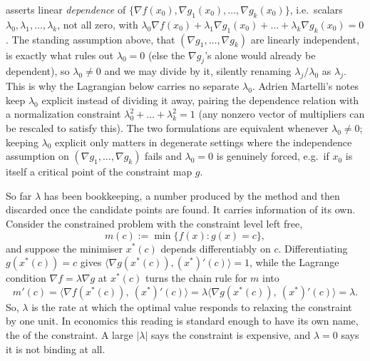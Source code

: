 \begin{remark}
 asserts linear \emph{dependence} of
$\{\nabla f(x_0), \nabla g_1(x_0), \dots, \nabla g_k(x_0)\}$, i.e.\ scalars
$\lambda_0, \lambda_1, \dots, \lambda_k$, not all zero, with
$\lambda_0 \nabla f(x_0) + \lambda_1 \nabla g_1(x_0) + \dots + \lambda_k \nabla g_k(x_0) = 0$.
The standing assumption above, that $(\nabla g_1,\dots,\nabla g_k)$ are linearly independent, is
exactly what rules out $\lambda_0 = 0$ (else the $\nabla g_j$'s alone would already be dependent),
so $\lambda_0 \neq 0$ and we may divide by it, silently renaming $\lambda_j/\lambda_0$ as
$\lambda_j$. This is why the Lagrangian below carries no separate $\lambda_0$. Adrien Martelli's
notes keep $\lambda_0$ explicit instead of dividing it away, pairing the dependence relation with
a normalization constraint $\lambda_0^2 + \dots + \lambda_k^2 = 1$ (any nonzero vector of
multipliers can be rescaled to satisfy this). The two formulations are equivalent whenever
$\lambda_0 \neq 0$; keeping $\lambda_0$ explicit only matters in degenerate settings where the
independence assumption on $(\nabla g_1,\dots,\nabla g_k)$ fails and $\lambda_0 = 0$ is genuinely
forced, e.g.\ if $x_0$ is itself a critical point of the constraint map $g$.
\end{remark}

\begin{remark}
\label{rem:lagrange_multiplier_sensitivity}
So far $\lambda$ has been bookkeeping, a number produced by the method and then discarded once
the candidate points are found. It carries information of its own. Consider the constrained
problem with the constraint level left free,
\[m(c) := \min\{f(x) : g(x) = c\},\]
and suppose the minimiser $x^*(c)$ depends differentiably on $c$. Differentiating
$g(x^*(c)) = c$ gives $\langle \nabla g(x^*(c)), (x^*)'(c)\rangle = 1$, while the Lagrange
condition $\nabla f = \lambda\nabla g$ at $x^*(c)$ turns the chain rule for $m$ into
\[m'(c) = \big\langle \nabla f(x^*(c)),\ (x^*)'(c)\big\rangle
        = \lambda\big\langle \nabla g(x^*(c)),\ (x^*)'(c)\big\rangle = \lambda.\]
So, $\lambda$ is the rate at which the optimal value responds to relaxing the constraint by one
unit. In economics this reading is standard enough to have its own name, the   of the constraint. A large $\lvert\lambda\rvert$ says the
constraint is expensive, and $\lambda = 0$ says it is not binding at all.
\end{remark}

